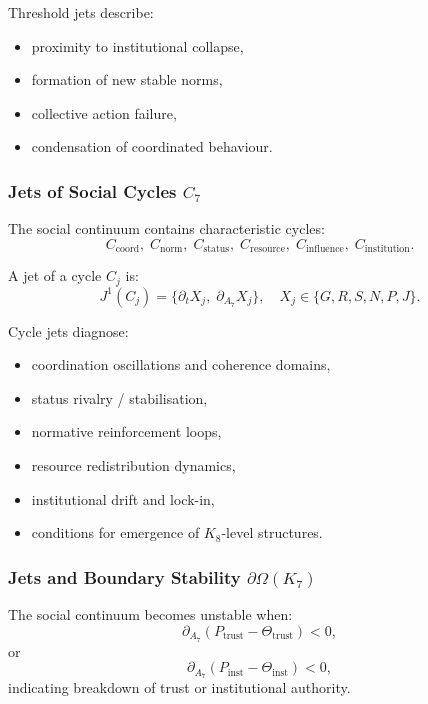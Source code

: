 Threshold jets describe:
\begin{itemize}
    \item proximity to institutional collapse,
    \item formation of new stable norms,
    \item collective action failure,
    \item condensation of coordinated behaviour.
\end{itemize}


\subsubsection{Jets of Social Cycles \texorpdfstring{$C_7$}{C_7}}

The social continuum contains characteristic cycles:
\[
C_{\mathrm{coord}},\;
C_{\mathrm{norm}},\;
C_{\mathrm{status}},\;
C_{\mathrm{resource}},\;
C_{\mathrm{influence}},\;
C_{\mathrm{institution}}.
\]

A jet of a cycle $C_j$ is:
\[
J^1(C_j)
=
\{
\partial_t X_j,\;
\partial_{A_7}X_j
\},
\quad 
X_j\in\{G,R,S,N,P,J\}.
\]

Cycle jets diagnose:
\begin{itemize}
    \item coordination oscillations and coherence domains,
    \item status rivalry / stabilisation,
    \item normative reinforcement loops,
    \item resource redistribution dynamics,
    \item institutional drift and lock-in,
    \item conditions for emergence of $K_8$-level structures.
\end{itemize}


\subsubsection{Jets and Boundary Stability \texorpdfstring{$\partial\Omega(K_7)$}{\partial\Omega(K_7)}}

The social continuum becomes unstable when:
\[
\partial_{A_7}(P_{\mathrm{trust}} - \Theta_{\mathrm{trust}}) < 0,
\]
or
\[
\partial_{A_7}(P_{\mathrm{inst}} - \Theta_{\mathrm{inst}}) < 0,
\]
indicating breakdown of trust or institutional authority.

